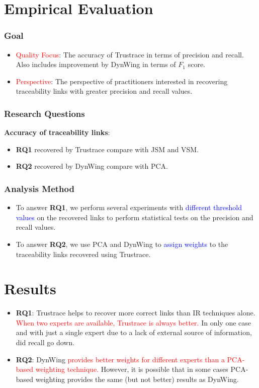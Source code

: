 \documentclass[12pt,hyperref=true,mathserif]{beamer}
\begin{document}
\section{Empirical Evaluation}
\begin{frame}
\frametitle{Goal}
\begin{itemize}
  \item \textcolor{red}{Quality Focus}:  The accuracy of  Trustrace in terms of precision and recall. Also includes improvement by DynWing in terms of $F_{1}$ score.\\[8pt]
  \item \textcolor{red}{Perspective}: The perspective of practitioners interested in recovering traceability links with greater precision and recall values.
\end{itemize}
\end{frame}

\begin{frame}
\frametitle{Research Questions}
\textbf{Accuracy of traceability links}:
\begin{itemize}
  \item \textbf{RQ1} recovered by Trustrace compare with JSM and VSM.\\[8pt]
  \item \textbf{RQ2} recovered by DynWing compare with PCA.
\end{itemize}
\end{frame}

\begin{frame}
\frametitle{Analysis Method}
\begin{itemize}
  \item To answer \textbf{RQ1}, we perform several experiments with \textcolor{blue}{different threshold values} on the recovered links to perform statistical tests on the precision and recall values.\\[8pt]
  \item To answer \textbf{RQ2}, we use PCA and DynWing to \textcolor{blue}{assign weights} to the traceability links recovered using Trustrace.
\end{itemize}
\end{frame}


\section{Results}
\begin{frame}
\begin{itemize}
  \item \textbf{RQ1}: Trustrace helps to recover more correct links than IR techniques alone. \textcolor{red}{When two experts are available, Trustrace is always better.} In only one case and with just a single expert due to a lack of external source of information, did recall go down.\\[8pt]
  \item \textbf{RQ2}: DynWing \textcolor{red}{provides better weights for different experts than a PCA-based weighting technique.} However, it is possible that in some cases PCA-based weighting provides the same (but not better) results as DynWing.
\end{itemize}
\end{frame}
\end{document}
